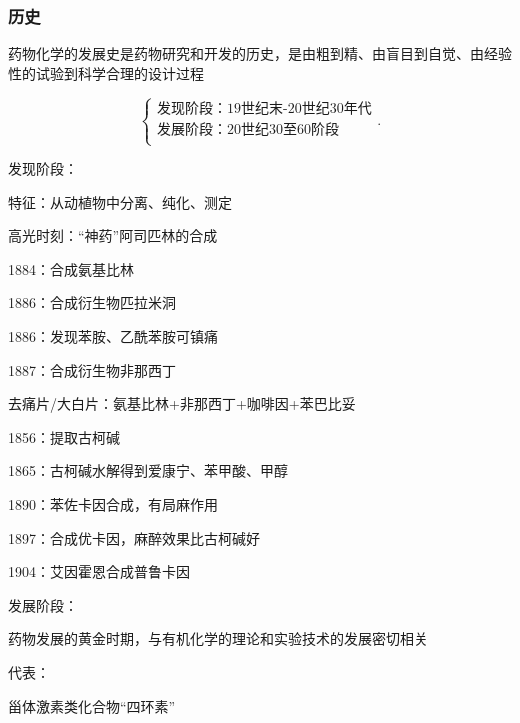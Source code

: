 \subsubsection{历史}%
\label{subsub:历史}
\begin{notation}
    药物化学的发展史是药物研究和开发的历史，是由粗到精、由盲目到自觉、由经验性的试验到科学合理的设计过程
\end{notation}
\[
    \begin{cases}
        \text{发现阶段：19世纪末-20世纪30年代}\\
        \text{发展阶段：20世纪30至60阶段}\\
        \text{}
    \end{cases}
.\] 
\begin{notation}
    发现阶段：

    特征：从动植物中分离、纯化、测定

    高光时刻：“神药”阿司匹林的合成

    1884：合成氨基比林

    1886：合成衍生物匹拉米洞

    1886：发现苯胺、乙酰苯胺可镇痛

    1887：合成衍生物非那西丁

    去痛片/大白片：氨基比林+非那西丁+咖啡因+苯巴比妥

    1856：提取古柯碱

    1865：古柯碱水解得到爱康宁、苯甲酸、甲醇

    1890：苯佐卡因合成，有局麻作用

    1897：合成优卡因，麻醉效果比古柯碱好

    1904：艾因霍恩合成普鲁卡因
\end{notation}
\begin{notation}
    发展阶段：

    药物发展的黄金时期，与有机化学的理论和实验技术的发展密切相关

    代表：
    
    甾体激素类化合物“四环素”
\end{notation}

